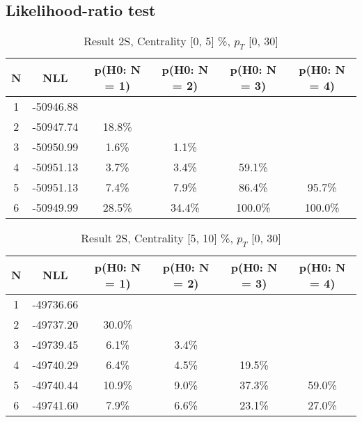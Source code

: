 \subsection{Likelihood-ratio test}
\begin{table}[htb]
	\begin{center}
	\caption{Result 2S, Centrality [0, 5] \%, $p_{T}$ [0, 30] \GeV
}
{\footnotesize\renewcommand{\arraystretch}{1.4}
		\begin{tabular}{cc||cc>{\columncolor[gray]{0.8}}cc}
			N & NLL & p(H0: N = 1) & p(H0: N = 2) & p(H0: N = 3) & p(H0: N = 4)\\ 
		\hline
1 & -50946.88 & & & & \\
2 & -50947.74 & 18.8\% & & & \\
3 & -50950.99 & 1.6\% & 1.1\% & & \\
4 & -50951.13 & 3.7\% & 3.4\% & 59.1\% & \\
5 & -50951.13 & 7.4\% & 7.9\% & 86.4\% & 95.7\% \\
6 & -50949.99 & 28.5\% & 34.4\% & 100.0\% & 100.0\% \\
	\end{tabular}
		\label{tab:lab}
	}
	\end{center}\end{table}

\begin{table}[htb]
	\begin{center}
	\caption{Result 2S, Centrality [5, 10] \%, $p_{T}$ [0, 30] \GeV
}
{\footnotesize\renewcommand{\arraystretch}{1.4}
		\begin{tabular}{cc||>{\columncolor[gray]{0.8}}cccc}
			N & NLL & p(H0: N = 1) & p(H0: N = 2) & p(H0: N = 3) & p(H0: N = 4)\\ 
		\hline
1 & -49736.66 & & & & \\
2 & -49737.20 & 30.0\% & & & \\
3 & -49739.45 & 6.1\% & 3.4\% & & \\
4 & -49740.29 & 6.4\% & 4.5\% & 19.5\% & \\
5 & -49740.44 & 10.9\% & 9.0\% & 37.3\% & 59.0\% \\
6 & -49741.60 & 7.9\% & 6.6\% & 23.1\% & 27.0\% \\
	\end{tabular}
		\label{tab:lab}
	}
	\end{center}\end{table}


